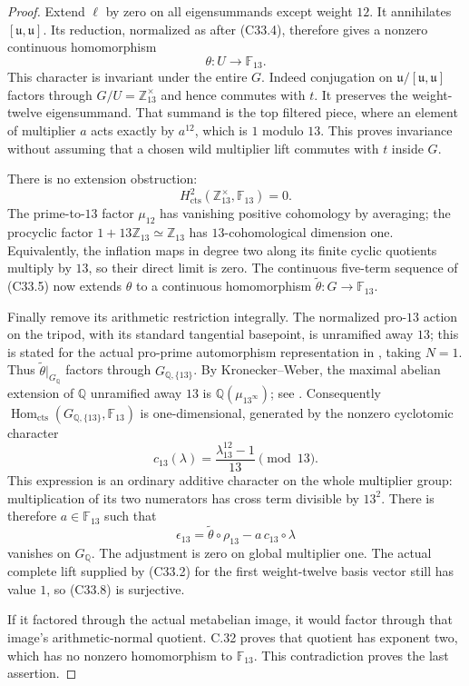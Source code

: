 \begin{proof}
Extend $\ell$ by zero on all eigensummands except weight $12$.
It annihilates $[\mathfrak u,\mathfrak u]$.  Its reduction,
normalized as after (C33.4), therefore gives a nonzero
continuous homomorphism
\[
                         \theta:U\longrightarrow\mathbb F_{13}.
                                                               \tag{C33.6}
\]
This character is invariant under the entire $G$.
Indeed conjugation on
$\mathfrak u/[\mathfrak u,\mathfrak u]$ factors through
$G/U=\mathbb Z_{13}^{\times}$ and hence commutes with $t$.
It preserves the weight-twelve eigensummand.  That summand
is the top filtered piece, where an element of multiplier
$a$ acts exactly by $a^{12}$, which is $1$ modulo $13$.
This proves invariance without assuming that a chosen wild
multiplier lift commutes with $t$ inside $G$.

There is no extension obstruction:
\[
 H^2_{\mathrm{cts}}(\mathbb Z_{13}^{\times},\mathbb F_{13})=0.
                                                               \tag{C33.7}
\]
The prime-to-$13$ factor $\mu_{12}$ has vanishing positive
cohomology by averaging; the procyclic factor
$1+13\mathbb Z_{13}\simeq\mathbb Z_{13}$ has
$13$-cohomological dimension one.  Equivalently, the
inflation maps in degree two along its finite cyclic
quotients multiply by $13$, so their direct limit is zero.
The continuous five-term sequence of (C33.5) now extends
$\theta$ to a continuous homomorphism
$\widetilde\theta:G\to\mathbb F_{13}$.

Finally remove its arithmetic restriction integrally.
The normalized pro-$13$ action on the tripod, with its
standard tangential basepoint, is unramified away $13$;
this is stated for the actual pro-prime automorphism
representation in \cite[\S8.5, immediately before
Theorem 8.7]{A_HainMatsumoto2003}, taking $N=1$.
Thus $\widetilde\theta|_{G_{\mathbb Q}}$ factors through
$G_{\mathbb Q,\{13\}}$.
By Kronecker--Weber, the maximal abelian extension of
$\mathbb Q$ unramified away $13$ is
$\mathbb Q(\mu_{13^\infty})$; see
\cite[Chapter I, Theorem 4.16 and its proof]{PBC_MilneCFT}.
Consequently
$\operatorname{Hom}_{\mathrm{cts}}
(G_{\mathbb Q,\{13\}},\mathbb F_{13})$ is one-dimensional,
generated by the nonzero cyclotomic character
\[
       c_{13}(\lambda)=\frac{\lambda_{13}^{12}-1}{13}\pmod {13}.
\]
This expression is an ordinary additive character on the
whole multiplier group: multiplication of its two numerators
has cross term divisible by $13^2$.
There is therefore $a\in\mathbb F_{13}$ such that
\[
 \epsilon_{13}=\widetilde\theta\circ\rho_{13}
                  -a\,c_{13}\circ\lambda
                                                               \tag{C33.8}
\]
vanishes on $G_{\mathbb Q}$.  The adjustment is zero on
global multiplier one.  The actual complete lift supplied
by (C33.2) for the first weight-twelve basis vector still
has value $1$, so (C33.8) is surjective.

If it factored through the actual metabelian image, it
would factor through that image's arithmetic-normal
quotient.  C.32 proves that quotient has exponent two,
which has no nonzero homomorphism to $\mathbb F_{13}$.
This contradiction proves the last assertion.
\end{proof}


